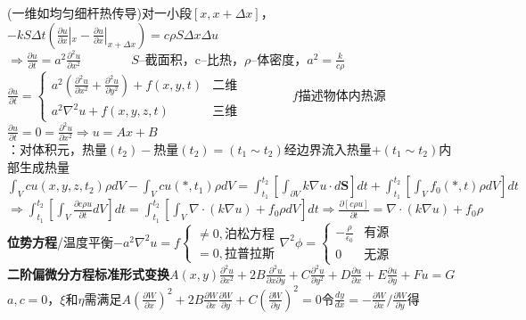 \documentclass[10pt,a4paper]{article}
\begin{document}
\begin{multicols}{2}
\indent(一维如均匀细杆热传导)对一小段$[x,x+\Delta x]$，$-kS\Delta t(\frac{\partial u}{\partial x}|_x-\frac{\partial u}{\partial x}|_{x+\Delta x})=c\rho S\Delta x\Delta u$\\
\indent\scriptsize$\Longrightarrow\frac{\partial u}{\partial t}=a^2\frac{\partial^2u}{\partial x^2}$~~~~~~~~$S$--截面积，c--比热，$\rho$--体密度，$a^2=\frac{k}{c\rho}$\scriptsize\\
\indent$\frac{\partial u}{\partial t}=\left\{\begin{array}{ll}a^2(\frac{\partial^2u}{\partial x^2}+\frac{\partial^2u}{\partial y^2})+f(x,y,t)&\text{二维}\\a^2\nabla^2u+f(x,y,z,t)&\text{三维}\end{array}\right.$~~~~~~~~$f$描述物体内热源\scriptsize\\
$\frac{\partial u}{\partial t}=0=\frac{\partial^2u}{\partial x^2}\Longrightarrow u=Ax+B$\\
\indent{}：对体积元，热量$(t_2)-$热量$(t_2)=(t_1\sim t_2)$经边界流入热量$+(t_1\sim t_2)$内部生成热量\\
\indent$\int_Vcu(x,y,z,t_2)\rho dV-\int_Vcu(*,t_1)\rho dV=\int_{t_1}^{t_2}[\int_{\partial V}k\nabla u\cdot d\bm{S}]dt+\int_{t_1}^{t_2}[\int_{V}f_0(*,t)\rho dV]dt$\\
\indent$\Longrightarrow\int_{t_1}^{t_2}[\int_V\frac{\partial c\rho u}{\partial t}dV]dt=\int_{t_1}^{t_2}[\int_{V}\nabla\cdot(k\nabla u)+f_0\rho dV]dt\Longrightarrow\frac{\partial[c\rho u]}{\partial t}=\nabla\cdot(k\nabla u)+f_0\rho$\scriptsize\\
\textbf{位势方程}/温度平衡\scriptsize$-a^2\nabla^2u=f\left\{\begin{array}{ll}\neq0,\text{泊松方程}\\=0,\text{拉普拉斯}\end{array}\right.$$\nabla^2\phi=\left\{\begin{array}{ll}-\frac{\rho}{\epsilon_0}&\text{有源}\\0&\text{无源}\end{array}\right.$\scriptsize\\
\textbf{二阶偏微分方程标准形式变换}$A(x,y)\frac{\partial^2u}{\partial x^2}+2B\frac{\partial^2u}{\partial x\partial y}+C\frac{\partial^2u}{\partial y^2}+D\frac{\partial u}{\partial x}+E\frac{\partial u}{\partial y}+Fu=G$\\
\indent{}$a,c=0$，$\xi$和$\eta$需满足$A(\frac{\partial W}{\partial x})^2+2B\frac{\partial W}{\partial x}\frac{\partial W}{\partial y}+C(\frac{\partial W}{\partial y})^2=0$令$\frac{dy}{dx}=-\frac{\partial W}{\partial x}/\frac{\partial W}{\partial y}$得\\

\end{multicols}
\end{document}
